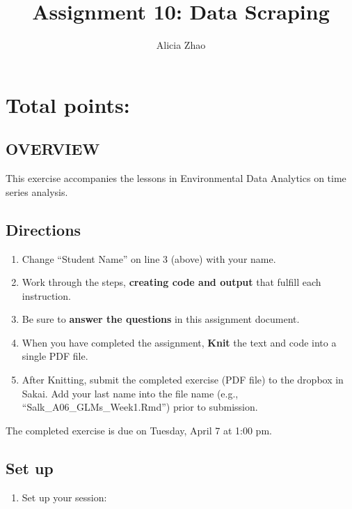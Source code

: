 \documentclass[]{article}
\title{Assignment 10: Data Scraping}
\author{Alicia Zhao}
\date{}
\providecommand{\tightlist}{%
  \setlength{\itemsep}{0pt}\setlength{\parskip}{0pt}}
\begin{document}
\maketitle

\hypertarget{total-points}{%
\section{Total points:}\label{total-points}}

\hypertarget{overview}{%
\subsection{OVERVIEW}\label{overview}}

This exercise accompanies the lessons in Environmental Data Analytics on
time series analysis.

\hypertarget{directions}{%
\subsection{Directions}\label{directions}}

\begin{enumerate}
\def\labelenumi{\arabic{enumi}.}
\tightlist
\item
  Change ``Student Name'' on line 3 (above) with your name.
\item
  Work through the steps, \textbf{creating code and output} that fulfill
  each instruction.
\item
  Be sure to \textbf{answer the questions} in this assignment document.
\item
  When you have completed the assignment, \textbf{Knit} the text and
  code into a single PDF file.
\item
  After Knitting, submit the completed exercise (PDF file) to the
  dropbox in Sakai. Add your last name into the file name (e.g.,
  ``Salk\_A06\_GLMs\_Week1.Rmd'') prior to submission.
\end{enumerate}

The completed exercise is due on Tuesday, April 7 at 1:00 pm.

\hypertarget{set-up}{%
\subsection{Set up}\label{set-up}}

\begin{enumerate}
\def\labelenumi{\arabic{enumi}.}
\tightlist
\item
  Set up your session:
\end{enumerate}
\end{document}
